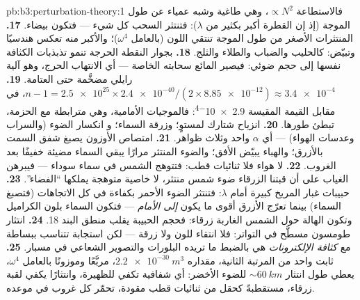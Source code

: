 \begin{solution}{pb:b3:perturbation-theory:1}
فالاستطاعة $\propto N^2$، وهي طاغية وشبه عمياء عن طول الموجة
(إذ إن القطرة أكبر بكثير من $\lambda$): فتنتثر السحب
كل شيء --- فتكون بيضاء.
\textbf{17.} المنتثرات الأصغر من طول الموجة تنتقي اللون
(بالعامل $\omega^4$)؛ والأكبر منه تعكس هندسيًا
وتبيّض: كالحليب والضباب والطلاء والثلج.
\textbf{18.} بجوار النقطة الحرجة تنمو تذبذبات الكثافة
نفسها إلى حجم ضوئي: فيصير المائع سحابته الخاصة
--- أي الانتهاب الحرج، وهو آلية رايلي مضخَّمة حتى
العتامة.
\textbf{19.} $n - 1 = \num{2.5e25} \times \num{2.4e-40}/(2 \times
\num{8.85e-12}) \approx \num{3.4e-4}$، في مقابل القيمة المقيسة
\num{2.9e-4}: فالموجيات الأمامية، وهي مترابطة مع الحزمة، تبطئ
طورها.
\textbf{20.} انزياح شتارك لمستوٍ؛ وزرقة السماء؛ و
انكسار الضوء (والسراب وعدسات الهواء) --- أي
$\alpha$ واحد وثلاث ظواهر.
\textbf{21.} امتصاص الأوزون يصبغ شفق السمت بالأزرق؛
والهباء يبيّض الأفق؛ والضوء المنتثر مرارًا يبقي
السماء مضيئة خفيفًا بعد الغروب.
\textbf{22.} لا هواء فلا ثنائيات قطب: فتتوهج الشمس في سماء سوداء
--- فيبرهن الغياب على أن قبتنا الزرقاء ضوء شمس منتثر،
لا خاصية متوهجة يملكها ``الفضاء''.
\textbf{23.} حبيبات غبار المريخ كبيرة أمام $\lambda$:
فتنتثر الضوء الأحمر بكفاءة في كل الاتجاهات (فتصبغ
السماء) بينما تعرّج الأزرق أقوى ما يكون \emph{إلى الأمام} ---
فتكون السماء بلون الكراميل وتكون الهالة حول الشمس الغاربة
زرقاء: فحجم الحبيبة يقلب منطق البند 18.
\textbf{24.} انتثار طومسون مسطَّح في التواتر: فلا انتقاء
للون ولا زرقة --- لكن استجابة تتناسب ببساطة مع
\emph{كثافة الإلكترونات} هي بالضبط ما تريده البلورات
والتصوير الشعاعي في مسبار.
\textbf{25.} ثابت واحد من المرتبة الثانية، مقداره $\qty{2.2e-30}{m^3}$،
مربَّعًا وموزونًا بالعامل $\omega^4$، يعطي طول انتثار $\sim\qty{60}{km}$
للضوء الأخضر: أي شفافية تكفي للظهيرة،
وانتثارًا يكفي لقبة زرقاء، مستقطبةً كحقل من ثنائيات
قطب مقودة، تحمّر كل غروب في موعده.
\end{solution}

